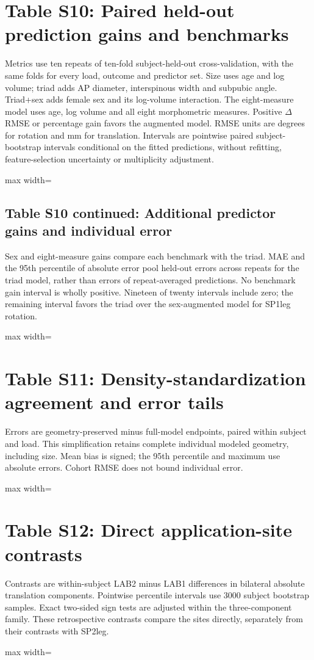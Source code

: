 \documentclass[11pt,a4paper]{article}
\newcommand{\SuppTableInput}[1]{%
  \par
  \begingroup
  \footnotesize
  \setlength{\tabcolsep}{4pt}%
  \renewcommand{\arraystretch}{1.1}%
  \noindent\centering
  \begin{adjustbox}{max width=\linewidth}
  \end{adjustbox}
  \par
  \endgroup
}
\begin{document}
\clearpage
\section*{Table S10: Paired held-out prediction gains and benchmarks}
Metrics use ten repeats of ten-fold subject-held-out cross-validation, with the same folds for every load, outcome and predictor set. Size uses age and log volume; triad adds AP diameter, interspinous width and subpubic angle. Triad+sex adds female sex and its log-volume interaction. The eight-measure model uses age, log volume and all eight morphometric measures. Positive $\Delta$RMSE or percentage gain favors the augmented model. RMSE units are degrees for rotation and mm for translation. Intervals are pointwise paired subject-bootstrap intervals conditional on the fitted predictions, without refitting, feature-selection uncertainty or multiplicity adjustment.
\SuppTableInput{../tables/prediction/supp_prediction.tex}

\subsection*{Table S10 continued: Additional predictor gains and individual error}
Sex and eight-measure gains compare each benchmark with the triad. MAE and the 95th percentile of absolute error pool held-out errors across repeats for the triad model, rather than errors of repeat-averaged predictions. No benchmark gain interval is wholly positive. Nineteen of twenty intervals include zero; the remaining interval favors the triad over the sex-augmented model for SP1leg rotation.
\SuppTableInput{../tables/prediction/supp_prediction_benchmarks.tex}

\clearpage
\section*{Table S11: Density-standardization agreement and error tails}
Errors are geometry-preserved minus full-model endpoints, paired within subject and load. This simplification retains complete individual modeled geometry, including size. Mean bias is signed; the 95th percentile and maximum use absolute errors. Cohort RMSE does not bound individual error.
\SuppTableInput{../tables/prediction/supp_agreement_tails.tex}

\section*{Table S12: Direct application-site contrasts}
Contrasts are within-subject LAB2 minus LAB1 differences in bilateral absolute translation components. Pointwise percentile intervals use 3000 subject bootstrap samples. Exact two-sided sign tests are adjusted within the three-component family. These retrospective contrasts compare the sites directly, separately from their contrasts with SP2leg.
\SuppTableInput{../tables/prediction/supp_site_contrasts.tex}
\end{document}
